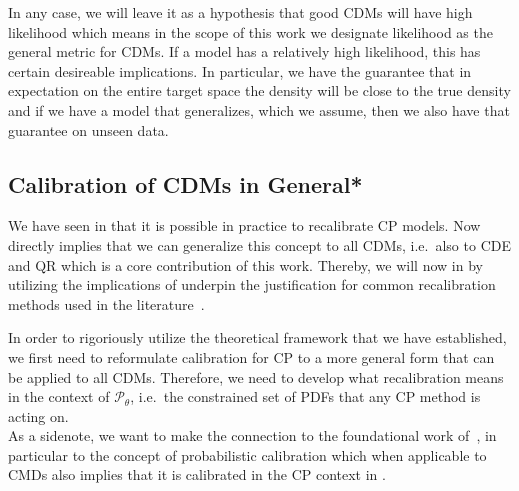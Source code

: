 In any case, we will leave it as a hypothesis that good CDMs will have high likelihood which means in the scope of this work we designate likelihood as the general metric for CDMs. If a model has a relatively high likelihood, this has certain desireable implications. In particular, we have the guarantee that in expectation on the entire target space the density will be close to the true density and if we have a model that generalizes, which we assume, then we also have that guarantee on unseen data.%

\subsection{Calibration of CDMs in General*}\label{sec:calibration_cde_general}

We have seen in  that it is possible in practice to recalibrate CP models. Now  directly implies that we can generalize this concept to all CDMs, i.e.\ also to CDE and QR which is a core contribution of this work. Thereby, we will now in  by utilizing the implications of  underpin the justification for common recalibration methods used in the literature~\cite{sesia2021conformal}.

In order to rigoriously utilize the theoretical framework that we have established, we first need to reformulate calibration for CP to a more general form that can be applied to all CDMs. Therefore, we need to develop what recalibration means in the context of $\mathscr{P}_{\theta}$, i.e.\ the constrained set of PDFs that any CP method is acting on.\\
As a sidenote, we want to make the connection to the foundational work of~\cite{gneiting2007probabilistic}, in particular to the concept of probabilistic calibration which when applicable to CMDs also implies that it is calibrated in the CP context in .

